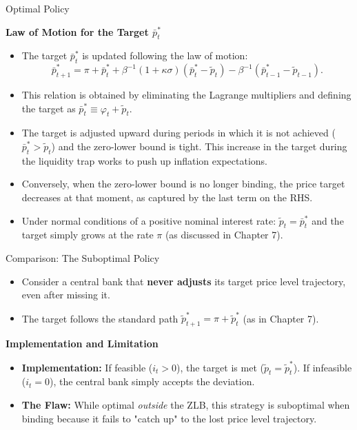 \documentclass[11pt,aspectratio=169]{beamer}
\begin{document}
\begin{frame}{Optimal Policy}
\small

\textbf{Law of Motion for the Target $\bar{p}_{t}^{\ast }$}
\begin{itemize}
    \item The target $\bar{p}_{t}^{\ast }$ is updated following the law of motion:
    \begin{equation*}
        \bar{p}_{t+1}^{\ast }=\pi +\bar{p}_{t}^{\ast }+\beta ^{-1}(1+\kappa \sigma )(\bar{p}_{t}^{\ast }-\tilde{p}_{t})-\beta ^{-1}(\bar{p}_{t-1}^{\ast }-\tilde{p}_{t-1}).
    \end{equation*}
    \item This relation is obtained by eliminating the Lagrange multipliers and defining the target as $\bar{p}_{t}^{\ast }\equiv \varphi _{t}+\tilde{p}_{t}$.
    \item The target is adjusted upward during periods in which it is not achieved ($\bar{p}_{t}^{\ast }>\tilde{p}_{t}$) and the zero-lower bound is tight. This increase in the target during the liquidity trap works to push up inflation expectations.
    \item Conversely, when the zero-lower bound is no longer binding, the price target decreases at that moment, as captured by the last term on the RHS.
    \item Under normal conditions of a positive nominal interest rate: $\tilde{p}_{t}=\bar{p}_{t}^{\ast }$ and the target simply grows at the rate $\pi$ (as discussed in Chapter 7).
\end{itemize}
\end{frame}
\begin{frame}{Comparison: The Suboptimal Policy}
\small

\begin{itemize}
    \item Consider a central bank  that\textbf{ never adjusts} its target price level trajectory, even after missing it.
    \item The target follows the standard path $\tilde{p}_{t+1}^{\ast }=\pi +\tilde{p}_{t}^{\ast }$ (as in Chapter 7).
\end{itemize}

\vspace{0.2cm}

\textbf{Implementation and Limitation}
\begin{itemize}
    \item \textbf{Implementation:} If feasible ($i_t > 0$), the target is met ($\tilde{p}_{t} = \tilde{p}_{t}^{\ast }$). If infeasible ($i_t = 0$), the central bank  simply accepts the deviation.
    \item \textbf{The Flaw:} While optimal \textit{outside} the ZLB, this strategy is suboptimal when binding because it fails to "catch up" to the lost price level trajectory.
\end{itemize}
\end{frame}
\end{document}
